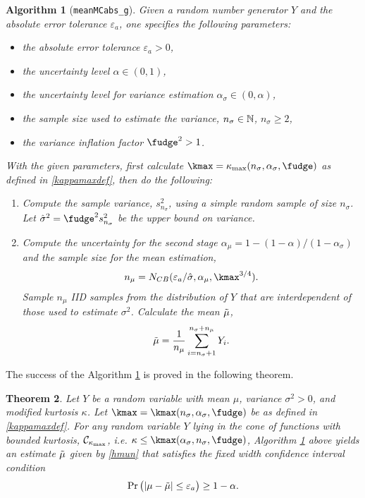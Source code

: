 \documentclass{iitthesis}
\newtheorem{theorem}{Theorem}[section]
\newtheorem{algorithm}[theorem]{Algorithm}
\begin{document}
\begin{algorithm}[{\tt meanMCabs\_g}]\label{alg:meanMCabsg}
Given a random number generator $Y$ and the absolute error tolerance $\varepsilon_a$, one specifies the following parameters:
\begin{itemize}
\item the absolute error tolerance $\varepsilon_a >0$,
\item the uncertainty level $\alpha \in (0,1)$,
\item the uncertainty level for variance estimation $\alpha_\sigma \in (0,\alpha)$,
\item the sample size used to estimate the variance, $n_{\sigma} \in \mathbb{N}$, $n_{\sigma} \geq 2$,
\item the variance inflation factor $\fudge^2 >1$.
\end{itemize}
With the given parameters, first calculate $\kmax=\kappa_{\max}(n_\sigma,\alpha_\sigma,\fudge)$ as defined in \eqref{kappamaxdef}, then do the following:
\begin{enumerate}
\item Compute the sample variance, $s^2_{n_{\sigma}}$, using a simple random sample of size $n_\sigma$. Let $\hsigma^2 = \fudge^2 s^2_{n_\sigma}$ be the upper bound on variance.
\item Compute the uncertainty for the second stage $\alpha_\mu = 1-(1-\alpha)/(1-\alpha_{\sigma})$ and the sample size for the mean estimation,
\begin{align}\label{NCBmeanMCabs}
n_\mu = N_{CB} (\varepsilon_a/\hsigma,\alpha_\mu, \kmax^{3/4}).
\end{align}
Sample $n_\mu$ IID samples from the distribution of $Y$ that are interdependent of those used to estimate $\sigma^2$. Calculate the mean $\tilde{\mu}$,
\begin{align}\label{hmun}
\tilde{\mu} = \frac{1}{n_\mu}\sum_{i = n_\sigma+1}^{n_\sigma+n_\mu}Y_i.
\end{align}
\end{enumerate}
\end{algorithm}
The success of the Algorithm \ref{alg:meanMCabsg} is proved in the following theorem.
\begin{theorem}\label{thm:meanMCabsg}
Let $Y$ be a random variable with mean $\mu$, variance $\sigma^2 >0$, and modified kurtosis $\kappa$. Let $\kmax=\kmax(n_\sigma,\alpha_\sigma,\fudge)$ be as defined in \eqref{kappamaxdef}. For any random variable $Y$ lying in the cone of functions with bounded kurtosis, $\mathcal{C}_{\kappa_{\max}}$, i.e.
$\kappa\leq\kmax(\alpha_{\sigma},n_{\sigma},\fudge)$, Algorithm \ref{alg:meanMCabsg} above yields an estimate $\tilde{\mu}$ given by \eqref{hmun} that satisfies the fixed width confidence interval condition
\begin{align}
\Pr\left( \left \lvert \mu-\tilde{\mu} \right \rvert \leq \varepsilon_a \right) \geq 1-\alpha.
\end{align}
\end{theorem}
\end{document}
